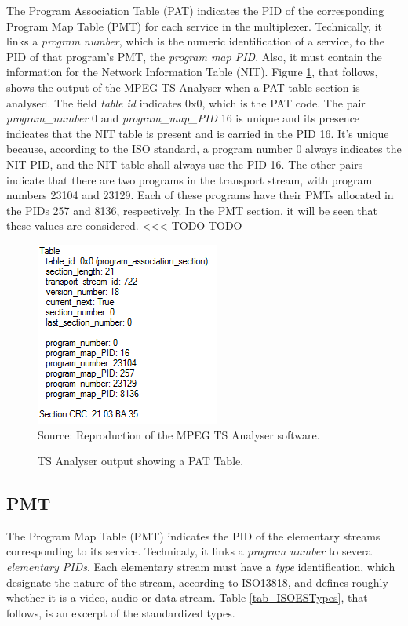 \documentclass[
	12pt,				%
	openright,			%
	twoside,			%
	a4paper,			%
	brazil,
	french,				%
	english
	]{abntex2}
\begin{document}
The Program Association Table (PAT) indicates the PID of the corresponding Program Map Table (PMT) for each service in the multiplexer. Technically, it links a \textit{program number}, which is the numeric identification of a service, to the PID of that program's PMT, the \textit{program map PID}. Also, it must contain the information for the Network Information Table (NIT). Figure \ref{fig:TSAnalyser_close_PAT}, that follows, shows the output of the MPEG TS Analyser when a PAT table section is analysed. The field \textit{table id} indicates 0x0, which is the PAT code. The pair \textit{program\_number} 0 and \textit{program\_map\_PID} 16 is unique and its presence indicates that the NIT table is present and is carried in the PID 16. It's unique because, according to the ISO standard, a program number 0 always indicates the NIT PID, and the NIT table shall always use the PID 16. The other pairs indicate that there are two programs in the transport stream, with program numbers 23104 and 23129. Each of these programs have their PMTs allocated in the PIDs 257 and 8136, respectively. In the PMT section, it will be seen that these values are considered. <<< TODO TODO

\begin{figure}[!hb]
\centering
\caption{TS Analyser output showing a PAT Table.}
\includegraphics[width=0.4\linewidth]{figuras/TSAnalyser_close_PAT.png}
\\Source: Reproduction of the MPEG TS Analyser software.
\label{fig:TSAnalyser_close_PAT}
\end{figure}

\subsection{PMT}

The Program Map Table (PMT) indicates the PID of the elementary streams corresponding to its service. Technicaly, it links a \textit{program number} to several \textit{elementary PIDs}. Each elementary stream must have a \textit{type} identification, which designate the nature of the stream, according to ISO13818, and defines roughly whether it is a video, audio or data stream. Table \ref{tab_ISOESTypes}, that follows, is an excerpt of the standardized types.
\end{document}
